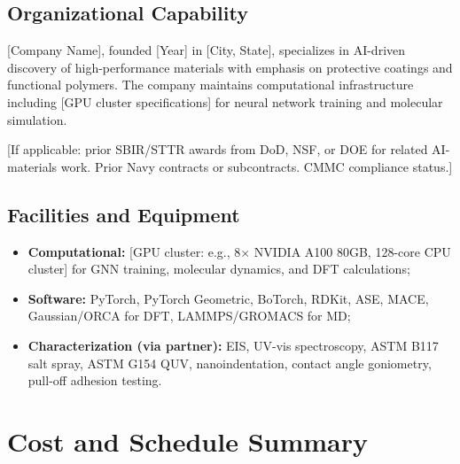 \documentclass[11pt,letterpaper]{article}
\begin{document}
\subsection{Organizational Capability}

[Company Name], founded [Year] in [City, State], specializes in AI-driven
discovery of high-performance materials with emphasis on protective coatings and
functional polymers. The company maintains computational infrastructure
including [GPU cluster specifications] for neural network training and molecular
simulation.

[If applicable: prior SBIR/STTR awards from DoD, NSF, or DOE for related
AI-materials work. Prior Navy contracts or subcontracts. CMMC compliance status.]

\subsection{Facilities and Equipment}

\begin{itemize}[nosep]
  \item \textbf{Computational:} [GPU cluster: e.g., 8$\times$ NVIDIA A100 80GB,
    128-core CPU cluster] for GNN training, molecular dynamics, and DFT
    calculations;
  \item \textbf{Software:} PyTorch, PyTorch Geometric, BoTorch, RDKit, ASE,
    MACE, Gaussian/ORCA for DFT, LAMMPS/GROMACS for MD;
  \item \textbf{Characterization (via partner):} EIS, UV-vis spectroscopy,
    ASTM B117 salt spray, ASTM G154 QUV, nanoindentation, contact angle
    goniometry, pull-off adhesion testing.
\end{itemize}

\section{Cost and Schedule Summary}
\label{sec:cost}
\end{document}
